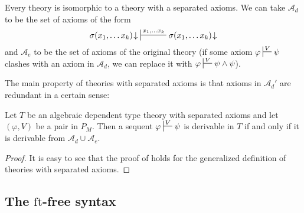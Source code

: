 \documentclass[reqno]{amsart}
\theoremstyle{definition}
\theoremstyle{remark}
\newcommand{\fs}[1]{\mathrm{#1}}
\newcommand{\ft}{\fs{ft}}
\numberwithin{figure}{section}
\begin{document}
\begin{remark}
Every theory is isomorphic to a theory with a separated axioms.
We can take $\mathcal{A}_d$ to be the set of axioms of the form
\[ \sigma(x_1, \ldots x_k)\!\downarrow\ \sststile{}{x_1, \ldots x_k} \sigma(x_1, \ldots x_k)\!\downarrow \]
and $\mathcal{A}_e$ to be the set of axioms of the original theory (if some axiom $\varphi \sststile{}{V} \psi$ clashes with an axiom in $\mathcal{A}_d$, we can replace it with $\varphi \sststile{}{V} \psi \land \psi$).
\end{remark}

The main property of theories with separated axioms is that axioms in $\mathcal{A}_d'$ are redundant in a certain sense:

\begin{prop}
Let $T$ be an algebraic dependent type theory with separated axioms and let $(\varphi,V)$ be a pair in $P_M$.
Then a sequent $\varphi \sststile{}{V} \psi$ is derivable in $T$ if and only if it is derivable from $\mathcal{A}_d \cup \mathcal{A}_e$.
\end{prop}
\begin{proof}
It is easy to see that the proof of \cite[Proposition~5.3]{morita-equiv} holds for the generalized definition of theories with separated axioms.
\end{proof}

\subsection{The $\ft$-free syntax}
\label{sec:contexts}
\end{document}
